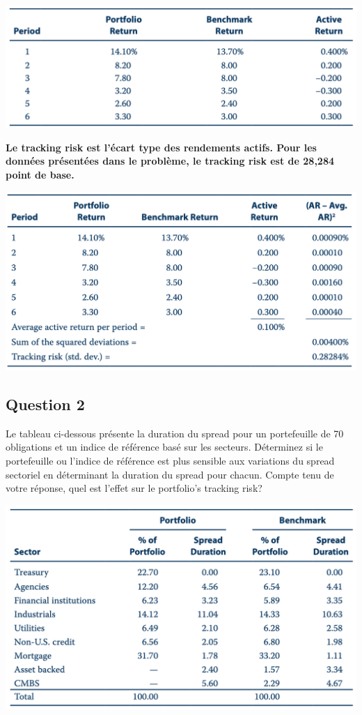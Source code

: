 \documentclass[12pt]{article}
\begin{document}
\begin{itemize}
\includegraphics[width=14cm]{5}

\textbf{Le tracking risk est l'écart type des rendements actifs. Pour les données présentées dans le problème, le tracking risk  est de 28,284 point de base.}

\includegraphics[width=14cm]{6}

\newpage

\subsection{Question 2}
Le tableau ci-dessous présente la duration du spread pour un portefeuille de 70 obligations et un indice de référence basé sur les secteurs. Déterminez si le portefeuille ou l'indice de référence est plus sensible aux variations du spread sectoriel en déterminant la duration du spread pour chacun. Compte tenu de votre réponse, quel est l’effet sur le portfolio’s tracking risk?

\includegraphics[width=14cm]{7}


\end{itemize}
\end{document}
